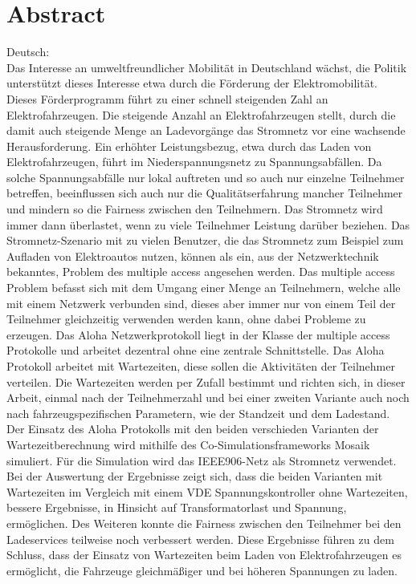 \thispagestyle{plain}

\section*{Abstract}
Deutsch:\\
Das Interesse an umweltfreundlicher Mobilität in Deutschland wächst, die Politik unterstützt dieses Interesse etwa durch die Förderung der Elektromobilität. Dieses Förderprogramm führt zu einer schnell steigenden Zahl an Elektrofahrzeugen. Die steigende Anzahl an Elektrofahrzeugen stellt, durch die damit auch steigende Menge an Ladevorgänge das Stromnetz vor eine wachsende Herausforderung. Ein erhöhter Leistungsbezug, etwa durch das Laden von Elektrofahrzeugen, führt im Niederspannungsnetz zu Spannungsabfällen. Da solche Spannungsabfälle nur lokal auftreten und so auch nur einzelne Teilnehmer betreffen, beeinflussen sich auch nur die Qualitätserfahrung mancher Teilnehmer und mindern so die Fairness zwischen den Teilnehmern. Das Stromnetz wird immer dann überlastet, wenn zu viele Teilnehmer Leistung darüber beziehen. Das Stromnetz-Szenario mit zu vielen Benutzer, die das Stromnetz zum Beispiel zum Aufladen von Elektroautos nutzen, können als ein, aus der Netzwerktechnik bekanntes, Problem des multiple access angesehen werden. Das multiple access Problem befasst sich mit dem Umgang einer Menge an Teilnehmern, welche alle mit einem Netzwerk verbunden sind, dieses aber immer nur von einem Teil der Teilnehmer gleichzeitig verwenden werden kann, ohne dabei Probleme zu erzeugen. Das Aloha Netzwerkprotokoll liegt in der Klasse der multiple access Protokolle und arbeitet dezentral ohne eine zentrale Schnittstelle. Das Aloha Protokoll arbeitet mit Wartezeiten, diese sollen die Aktivitäten der Teilnehmer verteilen. Die Wartezeiten werden per Zufall bestimmt und richten sich, in dieser Arbeit, einmal nach der Teilnehmerzahl und bei einer zweiten Variante auch noch nach fahrzeugspezifischen Parametern, wie der Standzeit und dem Ladestand. Der Einsatz des Aloha Protokolls mit den beiden verschieden Varianten der Wartezeitberechnung wird mithilfe des Co-Simulationsframeworks Mosaik simuliert. Für die Simulation wird das IEEE906-Netz als Stromnetz verwendet. Bei der Auswertung der Ergebnisse zeigt sich, dass die beiden Varianten mit Wartezeiten im Vergleich mit einem VDE Spannungskontroller ohne Wartezeiten, bessere Ergebnisse, in Hinsicht auf Transformatorlast und Spannung, ermöglichen. Des Weiteren konnte die Fairness zwischen den Teilnehmer bei den Ladeservices teilweise noch verbessert werden. Diese Ergebnisse führen zu dem Schluss, dass der Einsatz von Wartezeiten beim Laden von Elektrofahrzeugen es ermöglicht, die Fahrzeuge gleichmäßiger und bei höheren Spannungen zu laden. 
